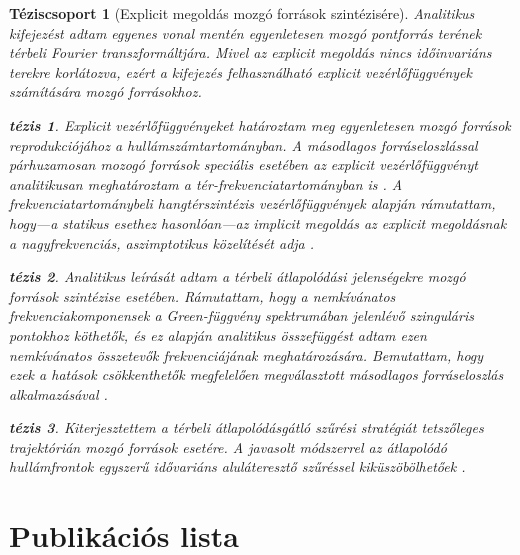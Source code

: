 \documentclass[10pt,twoside]{article}
\theoremstyle{thesisgroupstyle}
\newtheorem{thesisgroup}{Téziscsoport}
\theoremstyle{indented}
\newtheorem{thesis}{tézis}[thesisgroup]
\begin{document}
\begin{thesisgroup}[Explicit megoldás mozgó források szintézisére]
Analitikus kifejezést adtam egyenes vonal mentén egyenletesen mozgó pontforrás terének térbeli Fourier transzformáltjára.
Mivel az explicit megoldás nincs időinvariáns terekre korlátozva, ezért a kifejezés felhasználható explicit vezérlőfüggvények számítására mozgó forrásokhoz.
\begin{thesis} 
Explicit vezérlőfüggvényeket határoztam meg egyenletesen mozgó források reprodukciójához a hullámszámtartományban.
A másodlagos forráseloszlással párhuzamosan mozogó források speciális esetében az explicit vezérlőfüggvényt analitikusan meghatároztam a tér-frekvenciatartományban is \cite{Firtha2014:daga_booklet, Firtha2014:isma_booklet, firtha2015sound_booklet}.
A frekvenciatartománybeli hangtérszintézis vezérlőfüggvények alapján rámutattam, hogy---a statikus esethez hasonlóan---az implicit megoldás az explicit megoldásnak a nagyfrekvenciás, aszimptotikus közelítését adja \cite{firtha2015sound_booklet}. 
\end{thesis}
\begin{thesis}
Analitikus leírását adtam a térbeli átlapolódási jelenségekre mozgó források szintézise esetében.
Rámutattam, hogy a nemkívánatos frekvenciakomponensek a Green-függvény spektrumában jelenlévő szinguláris pontokhoz köthetők, és ez alapján analitikus összefüggést adtam ezen nemkívánatos összetevők frekvenciájának meghatározására.
Bemutattam, hogy ezek a hatások csökkenthetők megfelelően megválasztott másodlagos forráseloszlás alkalmazásával \cite{firtha2016:daga_booklet}.
\end{thesis}
\begin{thesis} 
Kiterjesztettem a térbeli átlapolódásgátló szűrési stratégiát tetszőleges trajektórián mozgó források esetére.
A javasolt módszerrel az átlapolódó hullámfrontok egyszerű idővariáns aluláteresztő szűréssel kiküszöbölhetőek \cite{Firtha2018_daga_moving_source_booklet}.
\end{thesis}
\end{thesisgroup} 
\clearpage

\section*{Publikációs lista}

\nocite{*}
\begin{refcontext}[labelprefix=J]
\printbibliography[title={Folyóiratcikkek}, keyword=J, heading=subbibliography] 
\end{refcontext}
\begin{refcontext}[labelprefix=C]
\printbibliography[title={Konferencia közlemények}, keyword=C, heading=subbibliography] 
\end{refcontext}
\begin{refcontext}[labelprefix=O]
\printbibliography[title={Egyéb publikációk}, keyword=O, heading=subbibliography] 
\end{refcontext}
\end{document}
